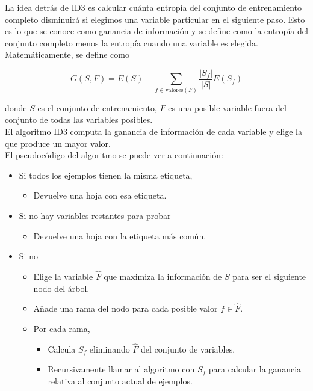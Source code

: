 La idea detrás de ID3 es calcular cuánta entropía del conjunto de entrenamiento completo disminuirá si elegimos una variable particular en el siguiente paso. Esto es lo que se conoce como ganancia de información y se define como la entropía del conjunto completo menos la entropía cuando una variable es elegida. Matemáticamente, se define como

\begin{equation}
G(S, F) = E(S) - \sum_{f \in \text{valores}(F)} \dfrac{|S_f|}{|S|} E(S_f)
\end{equation}

donde $S$ es el conjunto de entrenamiento, $F$ es una posible variable fuera del conjunto de todas las variables posibles.\\

El algoritmo ID3 computa la ganancia de información de cada variable y elige la que produce un mayor valor.\\

El pseudocódigo del algoritmo se puede ver a continuación:

\begin{itemize}
\item Si todos los ejemplos tienen la misma etiqueta,

\begin{itemize}
\item Devuelve una hoja con esa etiqueta.
\end{itemize}

\item Si no hay variables restantes para probar

\begin{itemize}
\item Devuelve una hoja con la etiqueta más común.
\end{itemize}

\item Si no

\begin{itemize}
\item Elige la variable $\hat{F}$ que maximiza la información de $S$ para ser el siguiente nodo del árbol.
\item Añade una rama del nodo para cada posible valor $f \in \hat{F}$.
\item Por cada rama,

\begin{itemize}
\item Calcula $S_f$ eliminando $\hat{F}$ del conjunto de variables.
\item Recursivamente llamar al algoritmo con $S_f$ para calcular la ganancia relativa al conjunto actual de ejemplos.
\end{itemize}

\end{itemize}

\end{itemize}


